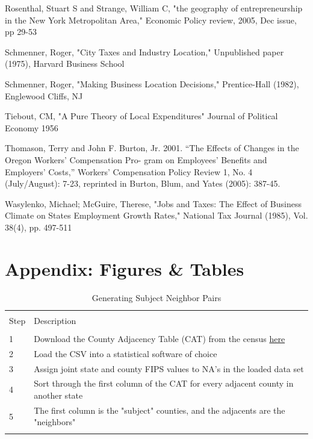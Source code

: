 \documentclass[12pt,a4paper]{article}
\begin{document}
\begin{thebibliography}{99}
Rosenthal, Stuart S and Strange, William C, "the geography of entrepreneurship in the New York Metropolitan Area," Economic Policy review, 2005, Dec issue, pp 29-53

Schmenner, Roger, "City Taxes and Industry Location," Unpublished paper (1975), Harvard Business School

Schmenner, Roger, "Making Business Location Decisions," Prentice-Hall (1982), Englewood Cliffs, NJ

Tiebout, CM, "A Pure Theory of Local Expenditures" Journal of Political Economy 1956

Thomason, Terry and John F. Burton, Jr. 2001. “The Effects of Changes in the Oregon Workers’ Compensation Pro-
gram on Employees’ Benefits and Employers’ Costs,” Workers’ Compensation Policy Review 1, No. 4 (July/August): 7-23, reprinted in Burton, Blum, and Yates (2005): 387-45. 

Wasylenko, Michael; McGuire, Therese, "Jobs and Taxes: The Effect of Business Climate on States Employment Growth Rates," National Tax Journal (1985), Vol. 38(4), pp. 497-511
\end{thebibliography}


\section{Appendix: Figures \& Tables}

\begin{table}[!htbp] \centering 
  \caption{Generating Subject Neighbor Pairs} 
  \label{gensubnbr} 
\begin{tabular}{@{\extracolsep{5pt}}ll} 
\\[-1.8ex]\hline 
\hline \\[-1.8ex] 
Step & Description\\ 
\hline \\[-1.8ex] 
1 & Download the County Adjacency Table (CAT) from the census \href{https://www.census.gov/geo/reference/county-adjacency.html}{here} \\
2 & Load the CSV into a statistical software of choice \\
3 & Assign joint state and county FIPS values to NA's in the loaded data set \\
4 & Sort through the first column of the CAT for every adjacent county in another state \\
5 & The first column is the "subject" counties, and the adjacents are the "neighbors" \\
\hline \\[-1.8ex]
\end{tabular} 
\end{table} 
\end{document}
